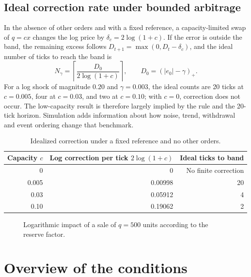 \subsection{Ideal correction rate under bounded arbitrage}

In the absence of other orders and with a fixed reference, a capacity-limited swap of $q=cx$ changes the log price by $\delta_c=2\log(1+c)$. If the error is outside the band, the remaining excess follows $D_{t+1}=\max(0,D_t-\delta_c)$, and the ideal number of ticks to reach the band is
\[
  N_\gamma=\left\lceil\frac{D_0}{2\log(1+c)}\right\rceil,\qquad D_0=(|e_0|-\gamma)_+.
\]
For a log shock of magnitude $0.20$ and $\gamma=0.003$, the ideal counts are 20 ticks at $c=0.005$, four at $c=0.03$, and two at $c=0.10$; with $c=0$, correction does not occur. The low-capacity result is therefore largely implied by the rule and the 20-tick horizon. Simulation adds information about how noise, trend, withdrawal and event ordering change that benchmark.

\begin{table}[htbp]
\centering
\caption{Idealized correction under a fixed reference and no other orders.}
\label{tab:capacity-benchmark}
\small
\begin{tabular}{@{}rrr@{}}
\toprule
Capacity $c$ & Log correction per tick $2\log(1+c)$ & Ideal ticks to band \\
\midrule
0 & 0 & No finite correction \\
0.005 & 0.00998 & 20 \\
0.03 & 0.05912 & 4 \\
0.10 & 0.19062 & 2 \\
\bottomrule
\end{tabular}
\end{table}

\begin{figure}[htbp]
\centering
{}
\caption{Logarithmic impact of a sale of $q=500$ units according to the reserve factor.}
\label{fig:impacto}
\end{figure}

\section{Overview of the conditions}

